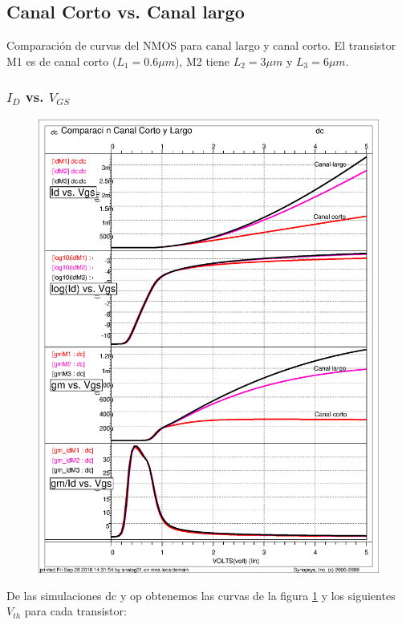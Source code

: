 
\everymath{\displaystyle} %


  
\subsection{Canal Corto vs. Canal largo}
Comparación de curvas del NMOS para canal largo y canal corto. El transistor M1 es de canal corto ($L_1=0.6\mu m$), M2 tiene $L_2=3\mu m$ y $L_3=6\mu m$.
\subsubsection{$I_D$ vs. $V_{GS}$}
\vspace{0.3cm}
\begin{figure}
\includegraphics[scale=0.6, angle=0]{images/todas}
\label{fig:ids_vgs}
\end{figure}
De las simulaciones dc y op obtenemos las curvas de la figura \ref{fig:ids_vgs} y los siguientes $V_{th}$ para cada transistor:

